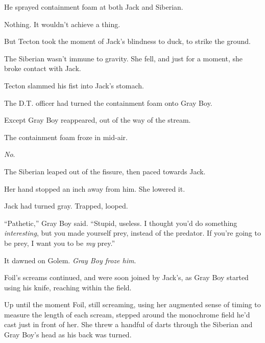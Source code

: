 He sprayed containment foam at both Jack and Siberian.



Nothing.  It wouldn't achieve a thing.



But Tecton took the moment of Jack's blindness to duck, to strike the ground.



The Siberian wasn't immune to gravity.  She fell, and just for a moment, she broke contact with Jack.



Tecton slammed his fist into Jack's stomach.



The D.T. officer had turned the containment foam onto Gray Boy.



Except Gray Boy reappeared, out of the way of the stream.



The containment foam froze in mid-air.



\emph{No}.



The Siberian leaped out of the fissure, then paced towards Jack.



Her hand stopped an inch away from him.  She lowered it.



Jack had turned gray.  Trapped, looped.



``Pathetic,'' Gray Boy said.  ``Stupid, useless.  I thought you'd do something \emph{interesting}, but you made yourself prey, instead of the predator.  If you're going to be prey, I want you to be \emph{my} prey.''



It dawned on Golem. \emph{ Gray Boy froze him}.



Foil's screams continued, and were soon joined by Jack's, as Gray Boy started using his knife, reaching within the field.



Up until the moment Foil, still screaming, using her augmented sense of timing to measure the length of each scream, stepped around the monochrome field he'd cast just in front of her.  She threw a handful of darts through the Siberian and Gray Boy's head as his back was turned.



